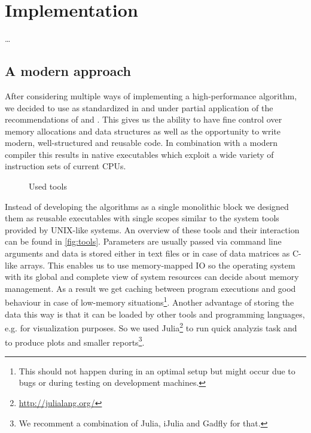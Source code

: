 \chapter{Implementation}
\label{ch:implementation}

\dots



\section{A modern approach}
\label{sec:implementation:approach}

After considering multiple ways of implementing a high-performance algorithm, we decided to use  as standardized in \cite{cpp14} and under partial application of the recommendations of \cite{effective_cpp} and \cite{effective_cpp2}. This gives us the ability to have fine control over memory allocations and data structures as well as the opportunity to write modern, well-structured and reusable code. In combination with a modern compiler this results in native executables which exploit a wide variety of instruction sets of current CPUs.

\begin{sidewaysfigure}
    \centering
    
    \caption{Used tools}
    \label{fig:tools}
\end{sidewaysfigure}

Instead of developing the algorithms as a single monolithic block we designed them as reusable executables with single scopes similar to the system tools provided by UNIX-like systems. An overview of these tools and their interaction can be found in \autoref{fig:tools}. Parameters are usually passed via command line arguments and data is stored either in text files or in case of data matrices as C-like arrays. This enables us to use memory-mapped IO so the operating system with its global and complete view of system resources can decide about memory management. As a result we get caching between program executions and good behaviour in case of low-memory situations\footnote{This should not happen during in an optimal setup but might occur due to bugs or during testing on development machines.}. Another advantage of storing the data this way is that it can be loaded by other tools and programming languages, e.g. for visualization purposes. So we used Julia\footnote{\url{http://julialang.org/}} to run quick analyzis task and to produce plots and smaller reports\footnote{We recomment a combination of Julia, iJulia and Gadfly for that.}.

